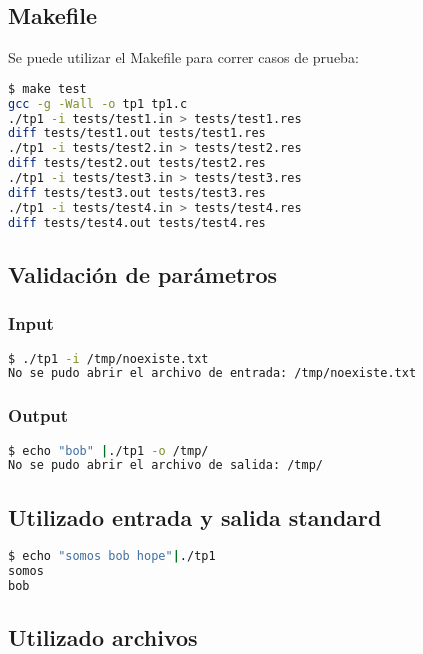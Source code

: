 \documentclass[10pt,a4paper]{article}
\begin{document}
\subsection{Makefile}

Se puede utilizar el Makefile para correr casos de prueba:

\begin{lstlisting}[language=bash]
$ make test
gcc -g -Wall -o tp1 tp1.c 
./tp1 -i tests/test1.in > tests/test1.res
diff tests/test1.out tests/test1.res
./tp1 -i tests/test2.in > tests/test2.res
diff tests/test2.out tests/test2.res
./tp1 -i tests/test3.in > tests/test3.res
diff tests/test3.out tests/test3.res
./tp1 -i tests/test4.in > tests/test4.res
diff tests/test4.out tests/test4.res
\end{lstlisting}

\subsection{Validación de parámetros}

\subsubsection{Input}

\begin{lstlisting}[language=bash]
$ ./tp1 -i /tmp/noexiste.txt
No se pudo abrir el archivo de entrada: /tmp/noexiste.txt
\end{lstlisting}

\subsubsection{Output}

\begin{lstlisting}[language=bash]
$ echo "bob" |./tp1 -o /tmp/
No se pudo abrir el archivo de salida: /tmp/
\end{lstlisting}

\subsection{Utilizado entrada y salida standard}

\begin{lstlisting}[language=bash]
$ echo "somos bob hope"|./tp1 
somos
bob
\end{lstlisting}

\subsection{Utilizado archivos}
\end{document}
